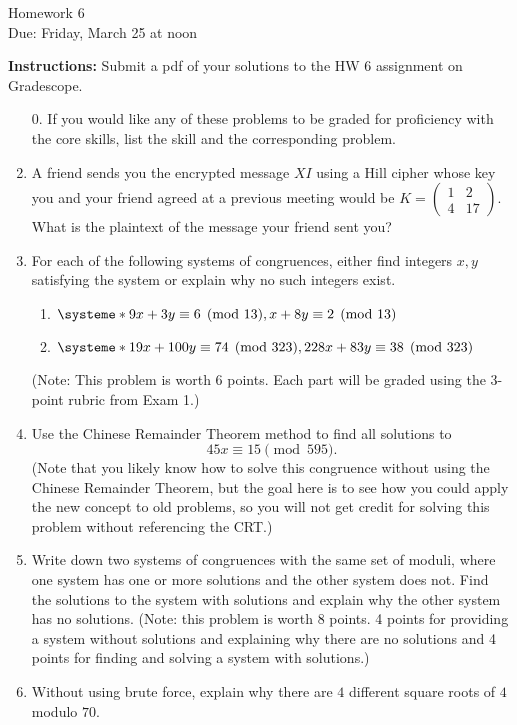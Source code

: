 \documentclass[12pt]{article}
\newcommand{\ds}{\displaystyle}
\begin{document}
\begin{center}
{\Large Homework 6}\\
Due: Friday,  March 25 at noon\\


\end{center}
{\bf Instructions:} Submit a pdf of your solutions to the HW 6 assignment on Gradescope. 



\begin{enumerate}
\item[0.] If you would like any of these problems to be graded for proficiency with the core skills, list the skill and the corresponding problem. 
 \item  A friend sends you the encrypted message $XI$ using a Hill cipher whose key you and your friend agreed at a previous meeting would be $K = \begin{pmatrix}
1 & 2\\ 
4 & 17
\end{pmatrix}$.  What is the plaintext of the message your friend sent you?

\item For each of the following systems of congruences, either find integers $x,y$ satisfying the system or explain why no such integers exist. 
\begin{enumerate}
\item  $\ds
\systeme*{9x+3y \equiv 6 \pmod {13}, x+8y \equiv 2 \pmod {13}}$
\item $\ds \systeme*{19x+100y \equiv 74 \pmod {323}, 228x+83y \equiv 38 \pmod {323}}$
\end{enumerate} 
(Note: This problem is worth 6 points. Each part will be graded using the 3-point rubric from Exam 1.)
\item Use the Chinese Remainder Theorem method to find all solutions to $$45x\equiv 15 \pmod{595}.$$ (Note that you likely know how to solve this congruence without using the Chinese Remainder Theorem, but the goal here is to see how you could apply the new concept to old problems, so you will not get credit for solving this problem without referencing the CRT.)
\item Write down two systems of congruences with the same set of moduli, where one system has one or more solutions and the other system does not.  Find the solutions to the system with solutions and explain why the other system has no solutions. 
(Note: this problem is worth 8 points.  4 points for providing a system without solutions and explaining why there are no solutions and 4 points for finding and solving a system with solutions.)
\item Without using brute force, explain why there are $4$ different square roots of $4$ modulo $70$.  
\end{enumerate}
\end{document}
